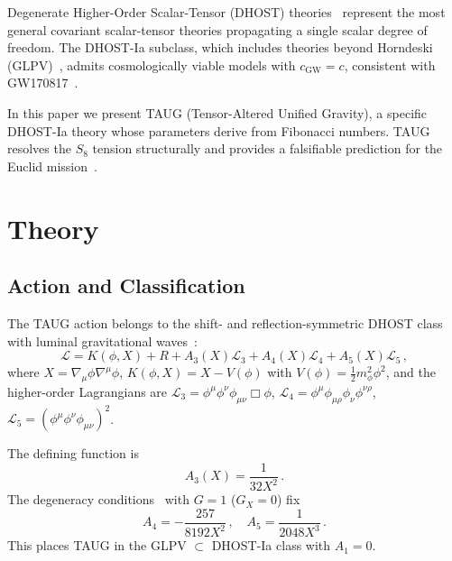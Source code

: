 \documentclass[twocolumn,showpacs,preprintnumbers,amsmath,amssymb,prd]{revtex4-2}
\begin{document}
Degenerate Higher-Order Scalar-Tensor (DHOST) theories~\cite{Langlois2016,BenAchour2016} represent the most general covariant scalar-tensor theories propagating a single scalar degree of freedom. The DHOST-Ia subclass, which includes theories beyond Horndeski (GLPV)~\cite{Gleyzes2015}, admits cosmologically viable models with $c_\mathrm{GW} = c$, consistent with GW170817~\cite{Abbott2017}.

In this paper we present TAUG (Tensor-Altered Unified Gravity), a specific DHOST-Ia theory whose parameters derive from Fibonacci numbers. TAUG resolves the $S_8$ tension structurally and provides a falsifiable prediction for the Euclid mission~\cite{EuclidMG2025}.

\section{Theory}
\label{sec:theory}

\subsection{Action and Classification}

The TAUG action belongs to the shift- and reflection-symmetric DHOST class with luminal gravitational waves~\cite{Charmousis2019}:
\begin{equation}
\mathcal{L} = K(\phi,X) + R + A_3(X)\mathcal{L}_3 + A_4(X)\mathcal{L}_4 + A_5(X)\mathcal{L}_5\,,
\label{eq:action}
\end{equation}
where $X = \nabla_\mu\phi\nabla^\mu\phi$, $K(\phi,X) = X - V(\phi)$ with $V(\phi) = \frac{1}{2}m_\phi^2\phi^2$, and the higher-order Lagrangians are $\mathcal{L}_3 = \phi^\mu\phi^\nu\phi_{\mu\nu}\Box\phi$, $\mathcal{L}_4 = \phi^\mu\phi_{\mu\rho}\phi_\nu\phi^{\nu\rho}$, $\mathcal{L}_5 = (\phi^\mu\phi^\nu\phi_{\mu\nu})^2$.

The defining function is
\begin{equation}
A_3(X) = \frac{1}{32X^2}\,.
\label{eq:A3}
\end{equation}
The degeneracy conditions~\cite{Langlois2016} with $G=1$ ($G_X=0$) fix
\begin{equation}
A_4 = -\frac{257}{8192X^2}\,,\quad A_5 = \frac{1}{2048X^3}\,.
\end{equation}
This places TAUG in the GLPV $\subset$ DHOST-Ia class with $A_1 = 0$.
\end{document}
